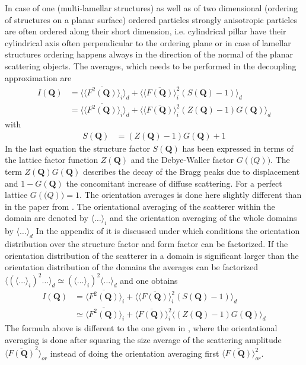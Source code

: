 In case of one (multi-lamellar structures) as well as of two dimensional (ordering of structures on a planar surface) ordered particles strongly anisotropic particles are often ordered along their short dimension, i.e. cylindrical pillar have their cylindrical axis often perpendicular to the ordering plane or in case of lamellar structures ordering happens always in the direction of the normal of the planar scattering objects.
The averages, which needs to be performed in the decoupling approximation are
\begin{subequations}
\begin{align}
\label{eq:DecouplingPlusLattice}
I(\mathbf{Q}) &= \langle\langle\overline{F^2(\mathbf{Q})}\rangle_{i}\rangle_{d} + \langle\langle\overline{F(\mathbf{Q})}\rangle_{i}^2 (S(\mathbf{Q})-1)\rangle_{d} \\
&= \langle\langle\overline{F^2(\mathbf{Q})}\rangle_{i}\rangle_{d} + \langle\langle\overline{F(\mathbf{Q})}\rangle_{i}^2 (Z(\mathbf{Q})-1) G(\mathbf{Q})\rangle_{d}
\end{align}
\end{subequations}
with
\begin{align}
S(\mathbf{Q}) &= (Z(\mathbf{Q})-1) G(\mathbf{Q}) + 1
\end{align}
In the last equation the structure factor $S(\mathbf{Q})$ has been expressed in terms of the lattice factor function $Z(\mathbf{Q})$ and the Debye-Waller factor $G(\mathbf(Q))$. The term $Z(\mathbf{Q})G(\mathbf{Q})$ describes the decay of the Bragg peaks due to displacement and $1-G(\mathbf{Q})$ the concomitant increase of diffuse scattering. For a perfect lattice $G(\mathbf(Q))=1$.
The orientation averages is done here slightly different than in the paper from \cite{Forster2011}. The orientational averaging of the scatterer within the domain are denoted by $\langle\ldots\rangle_{i}$ and the orientation averaging of the whole domains by $\langle\ldots\rangle_{d}$
In the appendix of \cite{Forster2011} it is discussed under which conditions the orientation distribution over the structure factor and form factor can be factorized. If the orientation distribution of the scatterer in a domain is significant larger than the orientation distribution of the domains the averages can be factorized $\langle\left(\langle\ldots\rangle_{i}\right)^2\ldots\rangle_{d}\simeq\left(\langle\ldots\rangle_{i}\right)^2\langle \ldots\rangle_d$ and one obtains
\begin{subequations}
\begin{align}
I(\mathbf{Q}) &=  \langle\overline{F^2(\mathbf{Q})}\rangle_{i} + \langle\langle\overline{F(\mathbf{Q})}\rangle_{i}^2 (S(\mathbf{Q})-1)\rangle_{d} \\
&\simeq\langle\overline{F^2(\mathbf{Q})}\rangle_{i} + \langle\overline{F(\mathbf{Q})}\rangle_{i}^2 \langle(Z(\mathbf{Q})-1) G(\mathbf{Q})\rangle_{d}
\end{align}
\end{subequations}
The formula above is different to the one given in \cite{Forster2011}, where the orientational averaging is done after squaring the size average of the scattering amplitude $\langle\overline{F(\mathbf{Q})}^2\rangle_{or}$ instead of doing the orientation averaging first $\langle\overline{F(\mathbf{Q})}\rangle_{or}^2$.

